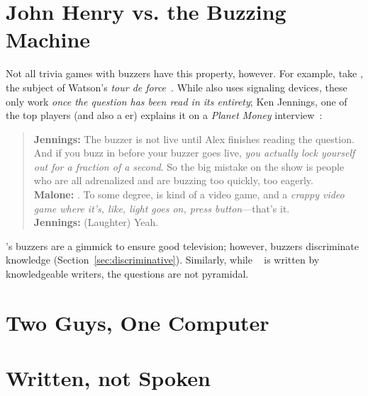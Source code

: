 \section{John Henry vs. the Buzzing Machine}

Not all trivia games with buzzers have this property, however.
For example, take \jeopardy{}, the subject of Watson's \textit{tour de force}~\cite{ferruci-10}.
While \jeopardy{} also uses signaling devices, these only work \emph{once the question has been read in its entirety}; Ken Jennings, one of the top \jeopardy{} players (and also a \qb{}er) explains it on a \textit{Planet Money} interview~\cite{malone-19}:
\begin{quote}
{\bf Jennings:} The buzzer is
    not live until Alex finishes reading the question. And if you buzz
    in before your buzzer goes live, \emph{you actually lock yourself out
    for a fraction of a second}. So the big mistake on the show is
    people who are all adrenalized and are buzzing too quickly, too
    eagerly. \\
{\bf Malone:} . To some degree, \jeopardy{} is kind of a video game, and a \emph{crappy video game where it's, like, light goes on, press button}---that's it. \\
{\bf Jennings:} (Laughter) Yeah. \\
\end{quote}
\jeopardy{}'s buzzers are a gimmick to ensure good television; however, \qb{} buzzers discriminate knowledge (Section~\ref{sec:discriminative}).
Similarly, while \triviaqa{}~\cite{joshi-17} is written by knowledgeable writers, the questions are not pyramidal.

\section{Two Guys, One Computer}


\section{Written, not Spoken}

\section{}
